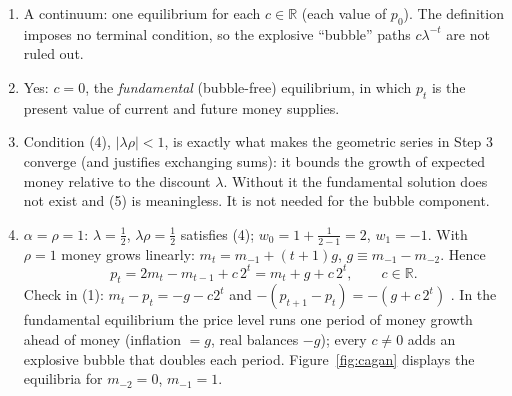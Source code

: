 \documentclass[12pt, letterpaper]{article}
\begin{document}
\begin{tcolorbox}[evenbox,title={Exercise 2.8 \quad Cagan Money Demand under Perfect Foresight}]
\begin{enumerate}
\emph{Step 3: sum.} Exchanging the order of summation,
\[
\begin{aligned}
\sum_{j\ge0}\lambda^jm_{t+j}&=\frac{m_t}{1-\lambda}+\Delta m_t\sum_{k\ge1}\rho^k\sum_{j\ge k}\lambda^j
=\frac{m_t}{1-\lambda}+\Delta m_t\sum_{k\ge1}\frac{(\lambda\rho)^k}{1-\lambda}\\
&=\frac{m_t}{1-\lambda}+\frac{\Delta m_t}{1-\lambda}\,\frac{\lambda\rho}{1-\lambda\rho}.
\end{aligned}
\]
\emph{Step 4: collect.} Multiplying by $1-\lambda$ and using
$\frac{\lambda\rho}{1-\lambda\rho}=\frac{\alpha\rho/(1+\alpha)}{(1+\alpha-\alpha\rho)/(1+\alpha)}=\frac{\alpha\rho}{1+\alpha-\alpha\rho}$:
\[
\boxed{\begin{gathered}p_t=w_0m_t+w_1m_{t-1}+f_t,\qquad f_t=c\left(\tfrac{1+\alpha}{\alpha}\right)^t,\\
w_0=1+\frac{\alpha\rho}{1+\alpha-\alpha\rho},\quad
w_1=-\frac{\alpha\rho}{1+\alpha-\alpha\rho},\quad w_j=0\ (j\ge2)\end{gathered}}
\]
so $n=1$. General recipe: $w(L)$ comes from applying the forward operator $(1-\lambda)(1-\lambda L^{-1})^{-1}$
to the money process and using (2) to replace future $m$'s by $m_t,m_{t-1}$ (the Hansen--Sargent
formula); $f_t$ solves the homogeneous forward equation.
\item A continuum: one equilibrium for each $c\in\mathbb R$ (each value of $p_0$). The definition
imposes no terminal condition, so the explosive ``bubble'' paths $c\lambda^{-t}$ are not ruled out.
\item Yes: $c=0$, the \emph{fundamental} (bubble-free) equilibrium, in which $p_t$ is the present
value of current and future money supplies.
\item Condition (4), $|\lambda\rho|<1$, is exactly what makes the geometric series in Step 3 converge
(and justifies exchanging sums): it bounds the growth of expected money relative to the discount
$\lambda$. Without it the fundamental solution does not exist and (5) is meaningless. It is not needed
for the bubble component.
\item $\alpha=\rho=1$: $\lambda=\frac12$, $\lambda\rho=\frac12$ satisfies (4); $w_0=1+\frac{1}{2-1}=2$,
$w_1=-1$. With $\rho=1$ money grows linearly: $m_t=m_{-1}+(t+1)g$, $g\equiv m_{-1}-m_{-2}$. Hence
\[
\boxed{p_t=2m_t-m_{t-1}+c\,2^t=m_t+g+c\,2^t,\qquad c\in\mathbb R.}
\]
Check in (1): $m_t-p_t=-g-c2^t$ and $-(p_{t+1}-p_t)=-(g+c\,2^t)$ \checkmark. In the fundamental
equilibrium the price level runs one period of money growth ahead of money (inflation $=g$, real
balances $-g$); every $c\neq0$ adds an explosive bubble that doubles each period.
Figure~\ref{fig:cagan} displays the equilibria for $m_{-2}=0$, $m_{-1}=1$.
\end{enumerate}


\end{tcolorbox}
\end{document}
